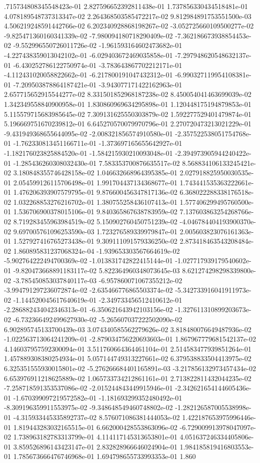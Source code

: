 .715734808345548423e-01	2.827596652392811438e-01	1.737856330434518481e-01	4.078189548737313347e-02	2.264368503585472217e-02	9.812984891753551500e-03	4.506219248591442766e-02	6.202340928868198267e-02	-3.052725660109500277e-02	-9.825471360160341339e-02	-7.980094180718290409e-02	-7.362186673938854453e-02	-9.552996550726011726e-02	-1.961593164602473682e-01	-4.227438359013042102e-01	-6.029403672469035858e-01	-7.297948620548632137e-01	-6.430252786122750974e-01	-3.783643867702212171e-01	-4.112431020058822662e-01	-6.217800191047432312e-01	-6.990327119954108381e-01	-7.209503878864187421e-01	-3.943077171422162963e-01	2.657715652915544277e-02	8.331501852968187238e-02	8.450054041463699039e-02	1.342349558840900958e-01	1.830860969634295898e-01	1.120448175194879853e-01	5.115579715683985645e-02	7.309131625550303879e-02	1.592277529401479874e-01	5.196669751670239812e-01	6.645270570079970796e-01	2.270720473213021229e-01	-9.431949368655644095e-02	-2.008321856574910580e-01	-2.357522538051754768e-01	-1.762330813451166711e-01	-1.373697165655642927e-01	-1.182176023825884520e-01	-1.584215930210093048e-01	-2.394973905944240422e-01	-1.285436260308032430e-01	7.583353700876635517e-02	8.568834106133245421e-02	3.180848355746428158e-02	1.046632668964395385e-01	2.027918825950030535e-01	2.054599126115706498e-01	1.991704437134368677e-01	1.743441535363222661e-01	1.476206393907579795e-01	9.876600456347817136e-02	6.368022288338176518e-02	1.032268853276216702e-01	1.380755258436107413e-01	1.577406299495760500e-01	1.536706900378015106e-01	9.840365867638783959e-02	7.137603863254268766e-02	8.719283455963984519e-02	5.150902760450751239e-02	-4.046784404193900370e-02	9.697005761096253590e-03	1.723276589339979847e-01	2.005603823076161363e-01	1.527927416765273438e-01	9.309111091579336250e-02	2.873418463543208484e-02	1.860895831237068324e-04	-1.939653303567664619e-02	-5.902764222494700369e-02	-1.013831742822415144e-01	-1.027717939179540602e-01	-9.820473668891183117e-02	5.822364960348073645e-03	8.621274298298339800e-02	-3.785450853037840117e-03	-6.957860071067355212e-02	-3.994791297236072874e-02	-2.635466776865503374e-02	-5.342733916041911973e-02	-1.144520045617640619e-01	-2.349733456512410612e-01	-2.286882434042346313e-01	-6.350621643942103156e-02	-1.327611310899203673e-02	-6.732366492499627930e-02	-5.265607037222502090e-02	6.902895745133700439e-03	3.074340585562279626e-02	3.818480076649487936e-02	-1.022563713064241209e-01	-2.879034756220693603e-01	1.867967779681542137e-02	4.146037957592300094e-01	3.511760664364461104e-01	2.514583477939851264e-01	1.457889308380254934e-01	5.057144749313227661e-02	6.379538833504413975e-02	6.325351555930015801e-02	-5.276266684401165891e-03	-3.217856132973457434e-02	6.653976911218625889e-02	1.065733734212861161e-01	2.713822811432044235e-02	-7.258718591353537086e-02	-2.015244843449915946e-01	-2.342621654144605436e-01	-1.670399097219572582e-01	-1.181693299352480492e-01	-8.309196359911553975e-02	-9.348648549460748802e-02	-1.282126587005538998e-01	-4.315933445335892737e-02	8.576071086381444053e-02	1.422187653975996446e-01	1.819443283032165515e-01	6.662000428553863096e-02	-6.729009913978047097e-02	1.738963182783313799e-01	4.114117145313653801e-01	4.051637246334405806e-01	3.859526896143423147e-01	2.832828966646024904e-01	1.984185819416803553e-01	1.785673666476746968e-01	1.694798655733993353e-01	1.860